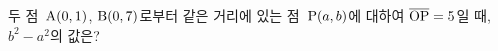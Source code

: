 두 점~$\mathrm{A}(0{,}\mkern3mu\mathopen{}1)$, $\mathrm{B}(0{,}\mkern3mu\mathopen{}7)$로부터 같은 거리에 있는 점~$\mathrm{P}(a{,}\mkern3mu\mathopen{}b)$에 대하여 $\overline{\mathrm{OP}}=5$일 때, $b^2-a^2$의 값은? 
